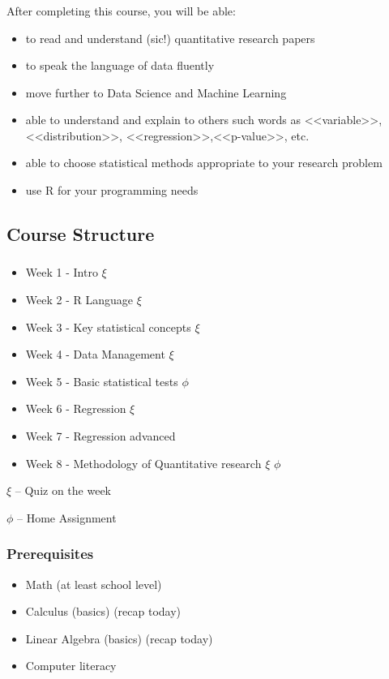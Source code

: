 \documentclass[t, 11pt]{beamer}
\begin{document}
	\begin{frame}\label{}
		\frametitle{\insertsection}
		\frametitle{\insertsubsection}
		
		After completing this course, you will be able: 
		\begin{itemize}
			\item to read and understand (sic!) quantitative research papers 
			\item to speak the language of data fluently
			\item move further to Data Science and Machine Learning 
			\item able to understand and explain to others such words as <<variable>>, <<distribution>>, <<regression>>,<<p-value>>, etc.
			\item able to choose statistical methods appropriate to your research problem 
			\item use R for your programming needs
		\end{itemize}
	\end{frame}
	
	
	\subsection{Course Structure} \label{}
	\begin{frame}
		\frametitle{\insertsection}
		\frametitle{\insertsubsection}  
		\begin{itemize}
			\item Week 1 - Intro $\xi$
			\item Week 2 - R Language $\xi$
			\item Week 3 - Key statistical concepts $\xi$
			\item Week 4 - Data Management $\xi$
			\item Week 5 - Basic statistical tests $\phi$
			\item Week 6 - Regression $\xi$ 
			\item Week 7 - Regression advanced
			\item Week 8 - Methodology of Quantitative research $\xi$ $\phi$
		\end{itemize}
		\vspace{1cm}
		$\xi$ -- Quiz on the week
		
		$\phi$ -- Home Assignment
	\end{frame}
	
	\begin{frame}
		\frametitle{\insertsection}
		\frametitle{Prerequisites}  
		\begin{itemize}
			
			\item Math (at least school level)
			\item Calculus (basics) (recap today)
			\item Linear Algebra (basics) (recap today)
			\item Computer literacy 
			
		\end{itemize}
	\end{frame}
	
\end{document}
